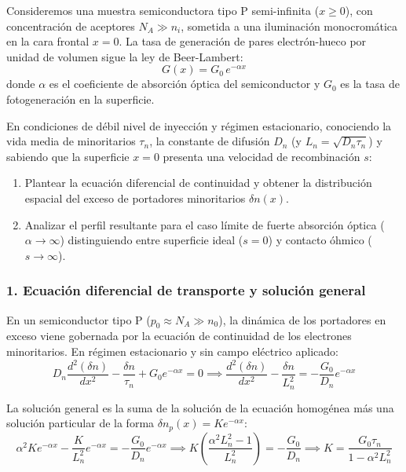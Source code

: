 \newpage
\begin{problema}
Consideremos una muestra semiconductora tipo P semi-infinita ($x \ge 0$), con concentración de aceptores $N_A \gg n_i$, sometida a una iluminación monocromática en la cara frontal $x = 0$. La tasa de generación de pares electrón-hueco por unidad de volumen sigue la ley de Beer-Lambert:
\[
G(x) = G_0 \, e^{-\alpha x}
\]
donde $\alpha$ es el coeficiente de absorción óptica del semiconductor y $G_0$ es la tasa de fotogeneración en la superficie.

En condiciones de débil nivel de inyección y régimen estacionario, conociendo la vida media de minoritarios $\tau_n$, la constante de difusión $D_n$ (y $L_n = \sqrt{D_n \tau_n}$) y sabiendo que la superficie $x = 0$ presenta una velocidad de recombinación $s$:

\begin{enumerate}[label=\alph*)]
    \item Plantear la ecuación diferencial de continuidad y obtener la distribución espacial del exceso de portadores minoritarios $\delta n(x)$.
    \item Analizar el perfil resultante para el caso límite de fuerte absorción óptica ($\alpha \to \infty$) distinguiendo entre superficie ideal ($s = 0$) y contacto óhmico ($s \to \infty$).
\end{enumerate}

\tcblower
\subsubsection*{1. Ecuación diferencial de transporte y solución general}
En un semiconductor tipo P ($p_0 \approx N_A \gg n_0$), la dinámica de los portadores en exceso viene gobernada por la ecuación de continuidad de los electrones minoritarios. En régimen estacionario y sin campo eléctrico aplicado:
\[
D_n \frac{d^2(\delta n)}{dx^2} - \frac{\delta n}{\tau_n} + G_0 e^{-\alpha x} = 0 \implies \frac{d^2(\delta n)}{dx^2} - \frac{\delta n}{L_n^2} = -\frac{G_0}{D_n} e^{-\alpha x}
\]

La solución general es la suma de la solución de la ecuación homogénea más una solución particular de la forma $\delta n_p(x) = K e^{-\alpha x}$:
\[
\alpha^2 K e^{-\alpha x} - \frac{K}{L_n^2} e^{-\alpha x} = -\frac{G_0}{D_n} e^{-\alpha x} \implies K \left( \frac{\alpha^2 L_n^2 - 1}{L_n^2} \right) = -\frac{G_0}{D_n} \implies K = \frac{G_0 \tau_n}{1 - \alpha^2 L_n^2}
\]


\end{problema}
